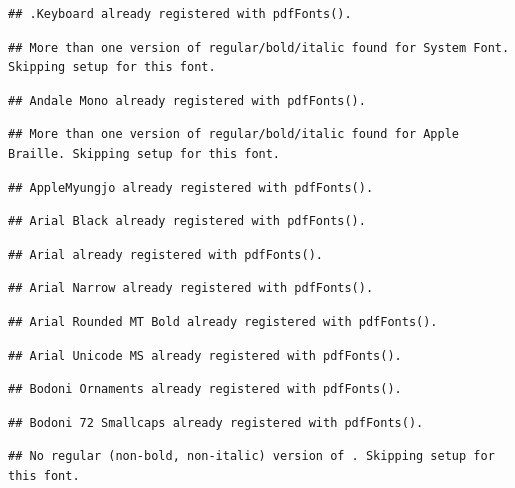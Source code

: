 \documentclass[]{article}
\theoremstyle{definition}
\theoremstyle{definition}
\theoremstyle{definition}
\theoremstyle{remark}
\begin{document}
\begin{verbatim}
## .Keyboard already registered with pdfFonts().
\end{verbatim}

\begin{verbatim}
## More than one version of regular/bold/italic found for System Font. Skipping setup for this font.
\end{verbatim}

\begin{verbatim}
## Andale Mono already registered with pdfFonts().
\end{verbatim}

\begin{verbatim}
## More than one version of regular/bold/italic found for Apple Braille. Skipping setup for this font.
\end{verbatim}

\begin{verbatim}
## AppleMyungjo already registered with pdfFonts().
\end{verbatim}

\begin{verbatim}
## Arial Black already registered with pdfFonts().
\end{verbatim}

\begin{verbatim}
## Arial already registered with pdfFonts().
\end{verbatim}

\begin{verbatim}
## Arial Narrow already registered with pdfFonts().
\end{verbatim}

\begin{verbatim}
## Arial Rounded MT Bold already registered with pdfFonts().
\end{verbatim}

\begin{verbatim}
## Arial Unicode MS already registered with pdfFonts().
\end{verbatim}

\begin{verbatim}
## Bodoni Ornaments already registered with pdfFonts().
\end{verbatim}

\begin{verbatim}
## Bodoni 72 Smallcaps already registered with pdfFonts().
\end{verbatim}

\begin{verbatim}
## No regular (non-bold, non-italic) version of . Skipping setup for this font.
\end{verbatim}
\end{document}
